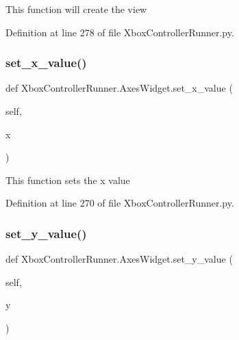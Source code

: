 \begin{DoxyVerb}This function will create the view\end{DoxyVerb}
 

Definition at line 278 of file Xbox\+Controller\+Runner.\+py.

\mbox{\label{class_xbox_controller_runner_1_1_axes_widget_a97aa9bbf6ef8690c5a1c4a6f69ce85ff}} 
\subsubsection{\texorpdfstring{set\+\_\+x\+\_\+value()}{set\_x\_value()}}
{\footnotesize\ttfamily def Xbox\+Controller\+Runner.\+Axes\+Widget.\+set\+\_\+x\+\_\+value (\begin{DoxyParamCaption}\item[{}]{self,  }\item[{}]{x }\end{DoxyParamCaption})}

\begin{DoxyVerb}This function sets the x value\end{DoxyVerb}
 

Definition at line 270 of file Xbox\+Controller\+Runner.\+py.

\mbox{\label{class_xbox_controller_runner_1_1_axes_widget_a39985b05c5647b717e8868d35cae01aa}} 
\subsubsection{\texorpdfstring{set\+\_\+y\+\_\+value()}{set\_y\_value()}}
{\footnotesize\ttfamily def Xbox\+Controller\+Runner.\+Axes\+Widget.\+set\+\_\+y\+\_\+value (\begin{DoxyParamCaption}\item[{}]{self,  }\item[{}]{y }\end{DoxyParamCaption})}

